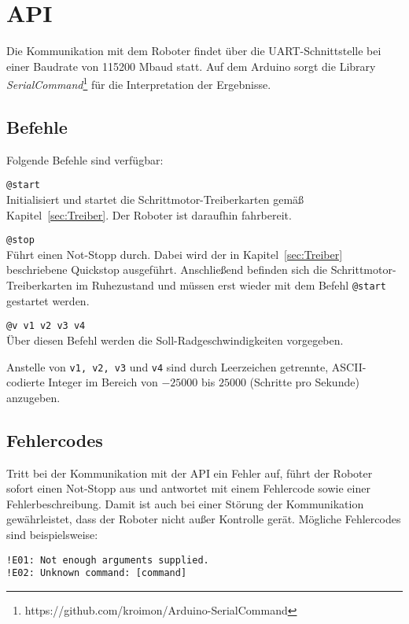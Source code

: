 
\section{API}
Die Kommunikation mit dem Roboter findet über die UART-Schnittstelle bei einer Baudrate von 115200 Mbaud statt.
Auf dem Arduino sorgt die Library \emph{SerialCommand}\footnote{https://github.com/kroimon/Arduino-SerialCommand} für die Interpretation der Ergebnisse.

\subsection{Befehle}
Folgende Befehle sind verfügbar:
\begin{description}
\item \lstinline{@start} \\
Initialisiert und startet die Schrittmotor-Treiberkarten gemäß Kapitel~\ref{sec:Treiber}.
Der Roboter ist daraufhin fahrbereit.

\item \lstinline{@stop} \\
Führt einen Not-Stopp durch. Dabei wird der in Kapitel~\ref{sec:Treiber} beschriebene Quickstop ausgeführt.
Anschließend befinden sich die Schrittmotor-Treiberkarten im Ruhezustand und müssen erst wieder mit dem Befehl \lstinline{@start} gestartet werden.

\item \lstinline{@v v1 v2 v3 v4} \\
Über diesen Befehl werden die Soll-Radgeschwindigkeiten vorgegeben.

Anstelle von \lstinline{v1, v2, v3} und \lstinline{v4} sind durch Leerzeichen getrennte, ASCII-codierte Integer im Bereich von $-25000$ bis $25000$ (Schritte pro Sekunde) anzugeben.
\end{description}


\subsection{Fehlercodes}
Tritt bei der Kommunikation mit der API ein Fehler auf, führt der Roboter sofort einen Not-Stopp aus und antwortet mit einem Fehlercode sowie einer Fehlerbeschreibung.
Damit ist auch bei einer Störung der Kommunikation gewährleistet, dass der Roboter nicht außer Kontrolle gerät.
Mögliche Fehlercodes sind beispielsweise:

\lstinline{!E01: Not enough arguments supplied.}\\
\lstinline{!E02: Unknown command: [command]}\\


